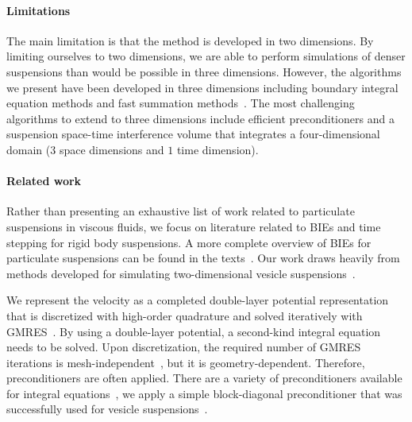 \documentclass[AMA,STIX1COL]{WileyNJD-v2}
\begin{document}
\paragraph{Limitations} The main limitation is that the method is
developed in two dimensions.  By limiting ourselves to two dimensions,
we are able to perform simulations of denser suspensions  than would be
possible in three dimensions.  However, the algorithms we present have
been developed in three dimensions including boundary integral equation
methods and fast summation methods~\cite{cor-gre-rac-vee2017,
kli-tor2014, kli-tor2016}.  The most challenging algorithms to extend to
three dimensions include efficient preconditioners and a suspension
space-time interference volume that integrates a four-dimensional domain
($3$ space dimensions and $1$ time dimension).


\paragraph{Related work} Rather than presenting an exhaustive list of
work related to particulate suspensions in viscous fluids, we focus on
literature related to BIEs and time stepping for rigid body suspensions.
A more complete overview of BIEs for particulate suspensions can be
found in the texts~\cite{Pozrikidis1992, Guazzelli2011, Karrila1991}.
Our work draws heavily from methods developed for simulating
two-dimensional vesicle suspensions~\cite{Quaife2014, Quaife2015,
qua-bir2016, Rahimian2010, Lu2017}.  

We represent the velocity as a completed double-layer potential
representation~\cite{Power1987, Power1993, Karrila1989} that is
discretized with high-order quadrature and solved iteratively with
GMRES~\cite{Saad1986}.  By using a double-layer potential, a second-kind
integral equation needs to be solved.  Upon discretization, the required
number of GMRES iterations is mesh-independent~\cite{Campbell1996}, but
it is geometry-dependent.  Therefore, preconditioners are often applied.
There are a variety of preconditioners available for integral
equations~\cite{cou-pou-dar2017, che2000, qua-cou-dar2018, Quaife2015a,
bra-lub1990, hem-sch1981}, we apply a simple block-diagonal
preconditioner that was successfully used for vesicle
suspensions~\cite{Quaife2014}.
\end{document}
